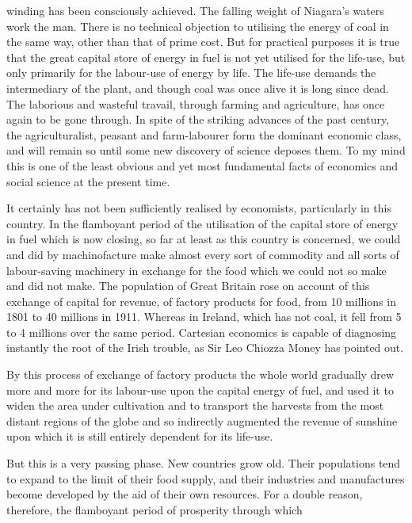 \documentclass[10.5pt,twoside]{book}
\newcommand{\origpage}[1]{\clearpage\setcounter{page}{#1}}
\begin{document}
\origpage{11}

\noindent winding has been consciously achieved. The falling weight of
Niagara's waters work the man. There is no technical objection to utilising
the energy of coal in the same way, other than that of prime cost. But for
practical purposes it is true that the great capital store of energy in fuel
is not yet utilised for the life-use, but only primarily for the labour-use of
energy by life. The life-use demands the intermediary of the plant, and though
coal was once alive it is long since dead. The laborious and wasteful travail,
through farming and agriculture, has once again to be gone through. In spite
of the striking advances of the past century, the agriculturalist, peasant and
farm-labourer form the dominant economic class, and will remain so until some
new discovery of science deposes them. To my mind this is one of the least
obvious and yet most fundamental facts of economics and social science at the
present time.

It certainly has not been sufficiently realised by economists, particularly in
this country. In the flamboyant period of the utilisation of the capital store
of energy in fuel which is now closing, so far at least as this country is
concerned, we could and did by machinofacture make almost every sort of
commodity and all sorts of labour-saving machinery in exchange for the food
which we could not so make and did not make. The population of Great Britain
rose on account of this exchange of capital for revenue, of factory products
for food, from 10 millions in 1801 to
40 millions in 1911. Whereas in Ireland, which has not
coal, it fell from 5 to 4 millions over the same period.
Cartesian economics is capable of diagnosing instantly the root of the Irish
trouble, as Sir Leo Chiozza Money has pointed out.

By this process of exchange of factory products the whole world gradually drew
more and more for its labour-use upon the capital energy of fuel, and used it
to widen the area under cultivation and to transport the harvests from the
most distant regions of the globe and so indirectly augmented the revenue of
sunshine upon which it is still entirely dependent for its life-use.

But this is a very passing phase. New countries grow old. Their populations
tend to expand to the limit of their food supply, and their industries and
manufactures become developed by the aid of their own resources. For a double
reason, therefore, the flamboyant period of prosperity through which
\end{document}
